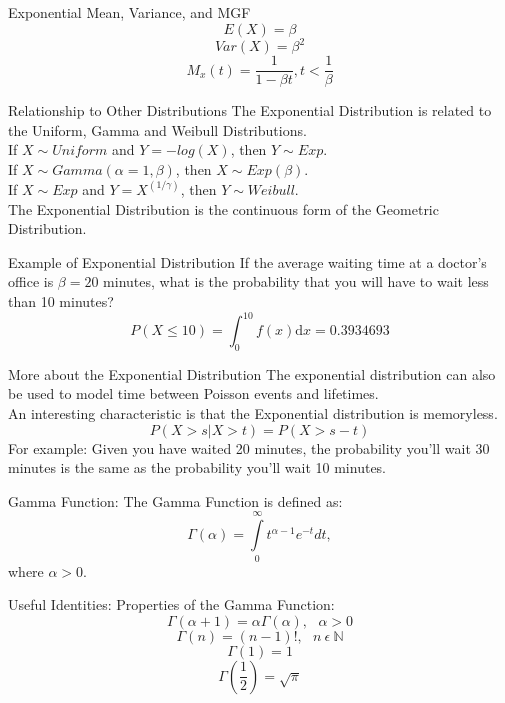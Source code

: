 \documentclass{beamer}
\begin{document}
\begin{frame}{Exponential Mean, Variance, and MGF}
\[
E(X) = \beta
\]
\[
Var(X) = \beta^2
\]
\[
M_{x}(t) = \frac{1}{1-\beta t} , t<\frac{1}{\beta}
\]
\end{frame}

\begin{frame}{Relationship to Other Distributions}
The Exponential Distribution is related to the Uniform, Gamma and Weibull Distributions.\\
\wl
If $X\sim Uniform$ and $Y=-log(X)$, then $Y\sim Exp$.\\
If $X\sim Gamma(\alpha = 1, \beta)$, then $X\sim Exp(\beta)$.\\
If $X\sim Exp$ and $Y=X^{(1/\gamma)}$, then $Y\sim Weibull$.\\
\wl
The Exponential Distribution is the continuous form of the Geometric Distribution.
\end{frame}

\begin{frame}{Example of Exponential Distribution}
If the average waiting time at a doctor's office is $\beta = 20$ minutes, what is the probability that you will have to wait less than 10 minutes?
\[
P(X \leq 10) = \int_0^{10} f(x)\mathrm{d}x = 0.3934693
\]
\end{frame}

\begin{frame}{More about the Exponential Distribution}
The exponential distribution can also be used to model time between Poisson events and lifetimes.\\
\wl
An interesting characteristic is that the Exponential distribution is memoryless.
\[
P( X > s | X> t) = P(X > s-t)
\]
For example: Given you have waited 20 minutes, the probability you'll wait 30 minutes is the same as the probability you'll wait 10 minutes.
\end{frame}

\begin{frame}{Gamma Function:}
    The Gamma Function is defined as:
    \[
      \Gamma (\alpha) = \int\limits_0^\infty {t^{\alpha - 1} e^{-t} dt},
    \]
    where $\alpha > 0$.
\end{frame}

\begin{frame}{Useful Identities:}
    Properties of the Gamma Function:
    \[
      \Gamma(\alpha+1) = \alpha\Gamma(\alpha), ~~~\alpha > 0
    \]
    \[
      \Gamma(n) = (n-1)!, ~~~ n ~ \epsilon ~ \mathbb{N}
    \]
    \[
      \Gamma(1) = 1
    \]
    \[
      \Gamma(\frac{1}{2}) = \sqrt{\pi}
    \]
\end{frame}
\end{document}
